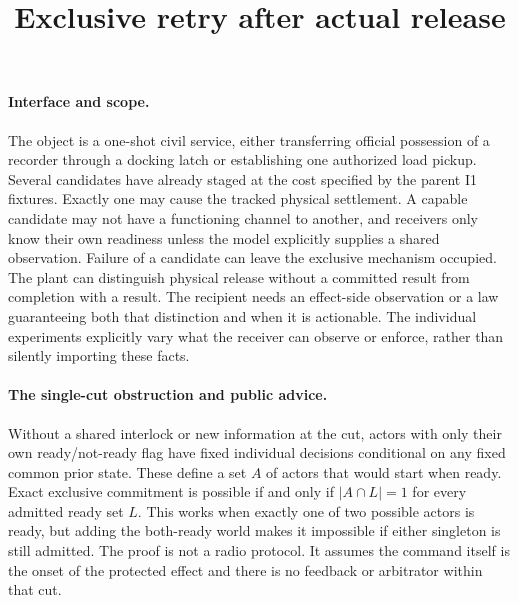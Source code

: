 \documentclass{article}
\title{Exclusive retry after actual release}
\date{}
\begin{document}
\maketitle

\paragraph{Interface and scope.}
The object is a one-shot civil service, either transferring official possession of a recorder through a docking latch or establishing one authorized load pickup. Several candidates have already staged at the cost specified by the parent I1 fixtures. Exactly one may cause the tracked physical settlement. A capable candidate may not have a functioning channel to another, and receivers only know their own readiness unless the model explicitly supplies a shared observation. Failure of a candidate can leave the exclusive mechanism occupied. The plant can distinguish physical release without a committed result from completion with a result. The recipient needs an effect-side observation or a law guaranteeing both that distinction and when it is actionable. The individual experiments explicitly vary what the receiver can observe or enforce, rather than silently importing these facts.

\paragraph{The single-cut obstruction and public advice.}
Without a shared interlock or new information at the cut, actors with only their own ready/not-ready flag have fixed individual decisions conditional on any fixed common prior state. These define a set $A$ of actors that would start when ready. Exact exclusive commitment is possible if and only if $|A\cap L|=1$ for every admitted ready set $L$. This works when exactly one of two possible actors is ready, but adding the both-ready world makes it impossible if either singleton is still admitted. The proof is not a radio protocol. It assumes the command itself is the onset of the protected effect and there is no feedback or arbitrator within that cut.
\end{document}
